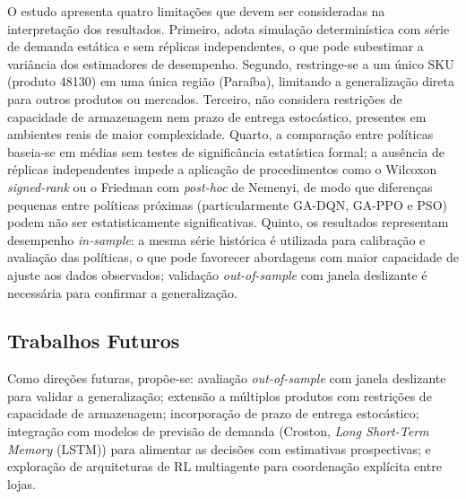 \documentclass[a4paper,11pt]{article}
\begin{document}
O estudo apresenta quatro limitações que devem ser consideradas na
interpretação dos resultados. Primeiro, adota simulação
determinística com série de demanda estática e sem réplicas
independentes, o que pode subestimar a variância dos estimadores
de desempenho. Segundo, restringe-se a um único SKU (produto 48130)
em uma única região (Paraíba), limitando a generalização direta
para outros produtos ou mercados. Terceiro, não considera restrições
de capacidade de armazenagem nem prazo de entrega estocástico,
presentes em ambientes reais de maior complexidade. Quarto, a
comparação entre políticas baseia-se em médias sem testes de
significância estatística formal; a ausência de réplicas independentes
impede a aplicação de procedimentos como o Wilcoxon
\textit{signed-rank} ou o Friedman com \textit{post-hoc} de Nemenyi,
de modo que diferenças pequenas entre políticas próximas
(particularmente GA-DQN, GA-PPO e PSO) podem não ser
estatisticamente significativas. Quinto, os resultados representam
desempenho \textit{in-sample}: a mesma série histórica é utilizada
para calibração e avaliação das políticas, o que pode favorecer
abordagens com maior capacidade de ajuste aos dados observados;
validação \textit{out-of-sample} com janela deslizante é necessária
para confirmar a generalização.

\subsection{Trabalhos Futuros}

Como direções futuras, propõe-se: avaliação \textit{out-of-sample}
com janela deslizante para validar a generalização; extensão a
múltiplos produtos com restrições de capacidade de armazenagem;
incorporação de prazo de entrega estocástico; integração com modelos
de previsão de demanda (Croston, \textit{Long Short-Term Memory}
(LSTM)) para alimentar as decisões com estimativas prospectivas;
e exploração de arquiteturas de RL multiagente para coordenação
explícita entre lojas.



\end{document}

